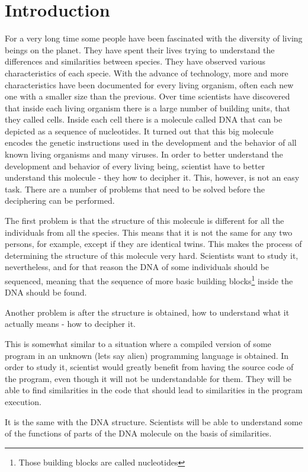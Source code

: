 \documentclass[11pt]{article}
\begin{document}
\section{Introduction}
\label{sec:Introduction}
For a very long time some people have been fascinated with the diversity of
living beings on the planet. They have spent their lives trying to understand
the differences and similarities between species. They have observed various
characteristics of each specie. With the advance of technology, more and more
characteristics have been documented for every living organism, often each new
one with a smaller size than the previous. Over time scientists have discovered
that inside each living organism there is a large number of building units, that
they called cells.  Inside each cell there is a molecule called DNA that can be
depicted as a sequence of nucleotides. It turned out that this big molecule
encodes the genetic instructions used in the development and the behavior of all
known living organisms and many viruses. In order to better understand the
development and behavior of every living being, scientist have to better
understand this molecule - they how to decipher it. This, however, is not an
easy task. There are a number of problems that need to be solved before the
deciphering can be performed. 

The first problem is that the structure of this molecule is different for all
the individuals from all the species. This means that it is not the same for any
two persons, for example, except if they are identical twins. This makes the
process of determining the structure of this molecule very hard. Scientists want
to study it, nevertheless, and for that reason the DNA of some individuals
should be sequenced, meaning that the sequence of more basic building
blocks\footnote{Those building blocks are called nucleotides} inside the DNA
should be found. 

Another problem is after the structure is obtained, how to understand what it
actually means - how to decipher it.

This is somewhat similar to a situation where a compiled version of some program
in an unknown (lets say alien) programming language is obtained. In order to
study it, scientist would greatly benefit from having the source code of the 
program, even though it will not be understandable for them. They will be able
to find similarities in the code that should lead to similarities in the program
execution. 

It is the same with the DNA structure. Scientists will be able to understand
some of the functions of parts of the DNA molecule on the basis of similarities.
\end{document}
